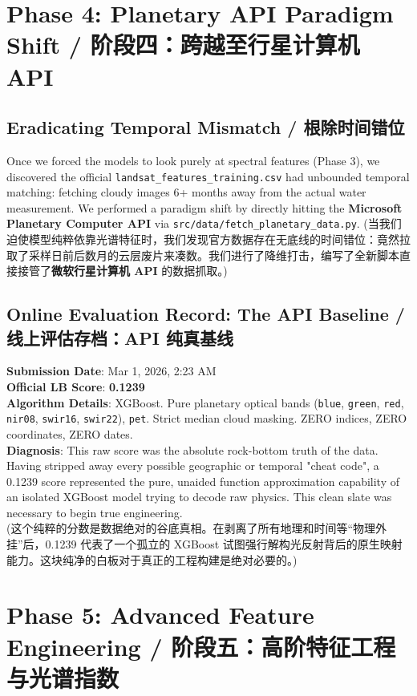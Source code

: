 \section{Phase 4: Planetary API Paradigm Shift / 阶段四：跨越至行星计算机 API}

\subsection{Eradicating Temporal Mismatch / 根除时间错位}
Once we forced the models to look purely at spectral features (Phase 3), we discovered the official \texttt{landsat\_features\_training.csv} had unbounded temporal matching: fetching cloudy images 6+ months away from the actual water measurement. We performed a paradigm shift by directly hitting the \textbf{Microsoft Planetary Computer API} via \texttt{src/data/fetch\_planetary\_data.py}.
(当我们迫使模型纯粹依靠光谱特征时，我们发现官方数据存在无底线的时间错位：竟然拉取了采样日前后数月的云层废片来凑数。我们进行了降维打击，编写了全新脚本直接接管了\textbf{微软行星计算机 API} 的数据抓取。)

\subsection{Online Evaluation Record: The API Baseline / 线上评估存档：API 纯真基线}
\begin{infobox}
\textbf{Submission Date}: Mar 1, 2026, 2:23 AM \\
\textbf{Official LB Score}: \textbf{0.1239} \\
\textbf{Algorithm Details}: XGBoost. Pure planetary optical bands (\texttt{blue}, \texttt{green}, \texttt{red}, \texttt{nir08}, \texttt{swir16}, \texttt{swir22}), \texttt{pet}. Strict median cloud masking. ZERO indices, ZERO coordinates, ZERO dates. \\
\textbf{Diagnosis}: This raw score was the absolute rock-bottom truth of the data. Having stripped away every possible geographic or temporal "cheat code", a 0.1239 score represented the pure, unaided function approximation capability of an isolated XGBoost model trying to decode raw physics. This clean slate was necessary to begin true engineering. \\
(这个纯粹的分数是数据绝对的谷底真相。在剥离了所有地理和时间等“物理外挂”后，0.1239 代表了一个孤立的 XGBoost 试图强行解构光反射背后的原生映射能力。这块纯净的白板对于真正的工程构建是绝对必要的。)
\end{infobox}

\section{Phase 5: Advanced Feature Engineering / 阶段五：高阶特征工程与光谱指数}

